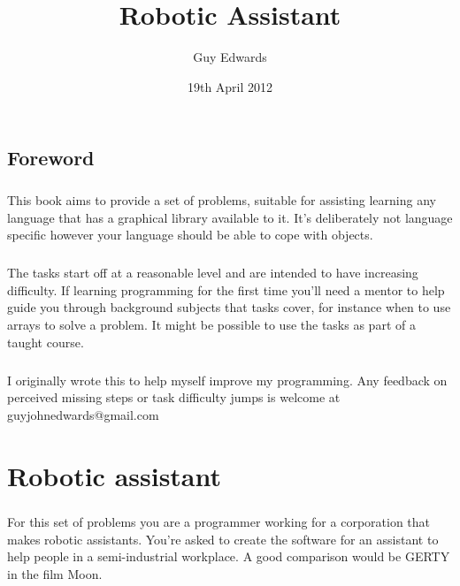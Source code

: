 \documentclass[11pt]{book}
\title{\textbf{Robotic Assistant}}
\author{Guy Edwards}
\date{19th April 2012}
\begin{document}
\maketitle

\section{Foreword}

\paragraph{} This book aims to provide a set of problems, suitable for assisting learning any language that has a graphical library available to it. It's deliberately not language specific however your language should be able to cope with objects.

\paragraph{} The tasks start off at a reasonable level and are intended to have increasing difficulty. If learning programming for the first time you'll need a mentor to help guide you through background subjects that tasks cover, for instance when to use arrays to solve a problem. It might be possible to use the tasks as part of a taught course.

\paragraph{} I originally wrote this to help myself improve my programming. Any feedback on perceived missing steps or task difficulty jumps is welcome at guyjohnedwards@gmail.com


\tableofcontents

\chapter{Robotic assistant}

\paragraph{} For this set of problems you are a programmer working for a corporation that makes robotic assistants. You're asked to create the software for an assistant to help people in a semi-industrial workplace. A good comparison would be GERTY in the film Moon.

\clearpage
\end{document}
